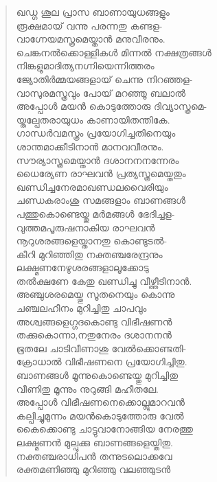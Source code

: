 \begin{verse}
ഖഡ്ഗ ശൂല പ്രാസ ബാണായുധങ്ങളും\\
രൂക്ഷമായ് വന്നു പരന്നതു കണ്ടള-\\
വാഗ്നേയമസ്ത്രമെയ്താന്‍ മനുവീരനും.\\
ചെങ്കനല്‍ക്കൊള്ളികള്‍ മിന്നല്‍ നക്ഷത്രങ്ങള്‍\\
നിങ്കളുമാദിത്യനഗ്നിയെന്നിത്തരം\\
ജ്യോതിര്‍മ്മയങ്ങളായ് ചെന്നു നിറഞ്ഞള-\\
വാസുരമസ്ത്രവും പോയ് മറഞ്ഞൂ ബലാല്‍\\
അപ്പോള്‍ മയന്‍ കൊടുത്തോരു ദിവ്യാസ്ത്രമെ-\\
യ്തല്പേതരായുധം കാണായിതന്തികേ.\\
ഗാന്ധര്‍വമസ്ത്രം പ്രയോഗിച്ചതിനെയും\\
ശാന്തമാക്കീടിനാന്‍ മാനവവീരനും.\\
സൗര്യാസ്ത്രമെയ്താന്‍ ദശാനനനന്നേരം\\
ധൈര്യേണ രാഘവന്‍ പ്രത്യസ്ത്രമെയ്തതും\\
ഖണ്ഡിച്ചനേരമാഖണ്ഡലവൈരിയും\\
ചണ്ഡകരാംശു സമങ്ങളാം ബാണങ്ങള്‍\\
പത്തുകൊണ്ടെയ്തു മര്‍മങ്ങള്‍ ഭേദിച്ചള-\\
വുത്തമപൂരുഷനാകിയ രാഘവന്‍\\
നൂറുശരങ്ങളെയ്താനതു കൊണ്ടുടല്‍-\\
കീറി മുറിഞ്ഞിതു നക്തഞ്ചരേന്ദ്രനും\\
ലക്ഷ്മണനേഴുശരങ്ങളാലൂക്കോടു\\
തല്‍ക്ഷണേ കേതു ഖണ്ഡിച്ചു വീഴ്ത്തീടിനാന്‍.\\
അഞ്ചുശരമെയ്തു സൂതനെയും കൊന്നു\\
ചഞ്ചലഹീനം മുറിച്ചിതു ചാപവും\\
അശ്വങ്ങളെഗ്ഗദകൊണ്ടു വിഭീഷണന്‍\\
തക്കുകൊന്നാ,നതുനേരം ദശാനനന്‍\\
ഭൂതലേ ചാടിവീണാശു വേല്‍ക്കൊണ്ടതി-\\
ക്രോധാല്‍ വിഭീഷണനെ പ്രയോഗിച്ചിതു.\\
ബാണങ്ങള്‍ മൂന്നുകൊണ്ടെയ്തു മുറിച്ചിതു\\
വീണിതു മൂന്നും നുറുങ്ങി മഹീതലേ.\\
അപ്പോള്‍ വിഭീഷണനെക്കൊല്ലുമാറവന്‍\\
കല്പിച്ചുമുന്നം മയന്‍കൊടുത്തോരു വേല്‍\\
കൈക്കൊണ്ടു ചാട്ടുവാനോങ്ങിയ നേരത്തു\\
ലക്ഷ്മണന്‍ മുല്പുക്കു ബാണങ്ങളെയ്തിതു.\\
നക്തഞ്ചരാധിപന്‍ തന്നുടലൊക്കവേ\\
രക്തമണിഞ്ഞു മുറിഞ്ഞു വലഞ്ഞുടന്‍\\

\end{verse}
